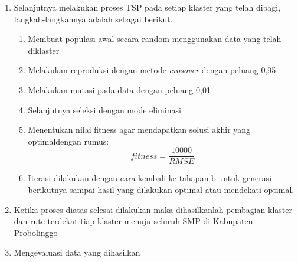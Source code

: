 \begin{enumerate}
	\item Selanjutnya melakukan proses TSP pada setiap klaster yang telah dibagi, langkah-langkahnya adalah sebagai berikut.
	\begin{enumerate}
	    \item Membuat populasi awal secara random menggunakan data yang telah diklaster
	    \item Melakukan reproduksi dengan metode \textit{crosover} dengan peluang 0,95
	    \item Melakukan mutasi pada data dengan peluang 0,01
	    \item Selanjutnya seleksi dengan mode eliminasi
	    \item Menentukan nilai fitness agar mendapatkan solusi akhir yang optimaldengan rumus:
	    \begin{equation}
	    fitness=\frac{10000}{RMSE}
	    \end{equation}
	    \item Iterasi dilakukan dengan cara kembali ke tahapan b untuk generasi berikutnya sampai hasil yang dilakukan optimal atau mendekati optimal.
    \end{enumerate}
	\item Ketika proses diatas selesai dilakukan maka dihasilkanlah pembagian klaster dan rute terdekat tiap klaster menuju seluruh SMP di Kabupaten Probolinggo
	\item Mengevaluasi data yang dihasilkan
\end{enumerate}